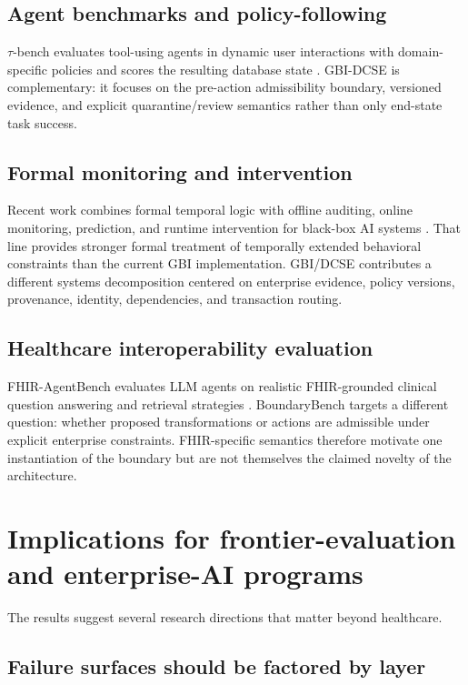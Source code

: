 \documentclass[11pt]{article}
\begin{document}
\subsection{Agent benchmarks and policy-following}

\(\tau\)-bench evaluates tool-using agents in dynamic user interactions with domain-specific policies and scores the resulting database state \cite{yao2024taubench}. GBI-DCSE is complementary: it focuses on the pre-action admissibility boundary, versioned evidence, and explicit quarantine/review semantics rather than only end-state task success.

\subsection{Formal monitoring and intervention}

Recent work combines formal temporal logic with offline auditing, online monitoring, prediction, and runtime intervention for black-box AI systems \cite{alamdari2026formal}. That line provides stronger formal treatment of temporally extended behavioral constraints than the current GBI implementation. GBI/DCSE contributes a different systems decomposition centered on enterprise evidence, policy versions, provenance, identity, dependencies, and transaction routing.

\subsection{Healthcare interoperability evaluation}

FHIR-AgentBench evaluates LLM agents on realistic FHIR-grounded clinical question answering and retrieval strategies \cite{lee2025fhiragentbench}. BoundaryBench targets a different question: whether proposed transformations or actions are admissible under explicit enterprise constraints. FHIR-specific semantics therefore motivate one instantiation of the boundary but are not themselves the claimed novelty of the architecture.

\section{Implications for frontier-evaluation and enterprise-AI programs}

The results suggest several research directions that matter beyond healthcare.

\subsection{Failure surfaces should be factored by layer}
\end{document}
